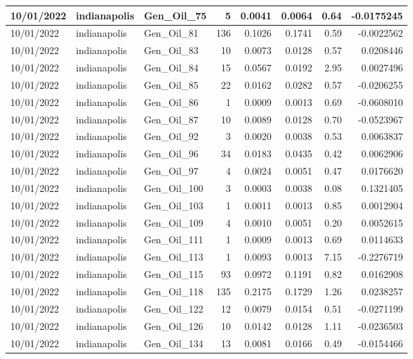 \documentclass[
  letterpaper,
  DIV=11,
  numbers=noendperiod]{scrartcl}
\begin{document}
\begin{tabular}{l|l|l|r|r|r|r|r}
\hline
10/01/2022 & indianapolis & Gen\_Oil\_75 & 5 & 0.0041 & 0.0064 & 0.64 & -0.0175245\\
\hline
10/01/2022 & indianapolis & Gen\_Oil\_81 & 136 & 0.1026 & 0.1741 & 0.59 & -0.0022562\\
\hline
10/01/2022 & indianapolis & Gen\_Oil\_83 & 10 & 0.0073 & 0.0128 & 0.57 & 0.0208446\\
\hline
10/01/2022 & indianapolis & Gen\_Oil\_84 & 15 & 0.0567 & 0.0192 & 2.95 & 0.0027496\\
\hline
10/01/2022 & indianapolis & Gen\_Oil\_85 & 22 & 0.0162 & 0.0282 & 0.57 & -0.0206255\\
\hline
10/01/2022 & indianapolis & Gen\_Oil\_86 & 1 & 0.0009 & 0.0013 & 0.69 & -0.0608010\\
\hline
10/01/2022 & indianapolis & Gen\_Oil\_87 & 10 & 0.0089 & 0.0128 & 0.70 & -0.0523967\\
\hline
10/01/2022 & indianapolis & Gen\_Oil\_92 & 3 & 0.0020 & 0.0038 & 0.53 & 0.0063837\\
\hline
10/01/2022 & indianapolis & Gen\_Oil\_96 & 34 & 0.0183 & 0.0435 & 0.42 & 0.0062906\\
\hline
10/01/2022 & indianapolis & Gen\_Oil\_97 & 4 & 0.0024 & 0.0051 & 0.47 & 0.0176620\\
\hline
10/01/2022 & indianapolis & Gen\_Oil\_100 & 3 & 0.0003 & 0.0038 & 0.08 & 0.1321405\\
\hline
10/01/2022 & indianapolis & Gen\_Oil\_103 & 1 & 0.0011 & 0.0013 & 0.85 & 0.0012904\\
\hline
10/01/2022 & indianapolis & Gen\_Oil\_109 & 4 & 0.0010 & 0.0051 & 0.20 & 0.0052615\\
\hline
10/01/2022 & indianapolis & Gen\_Oil\_111 & 1 & 0.0009 & 0.0013 & 0.69 & 0.0114633\\
\hline
10/01/2022 & indianapolis & Gen\_Oil\_113 & 1 & 0.0093 & 0.0013 & 7.15 & -0.2276719\\
\hline
10/01/2022 & indianapolis & Gen\_Oil\_115 & 93 & 0.0972 & 0.1191 & 0.82 & 0.0162908\\
\hline
10/01/2022 & indianapolis & Gen\_Oil\_118 & 135 & 0.2175 & 0.1729 & 1.26 & 0.0238257\\
\hline
10/01/2022 & indianapolis & Gen\_Oil\_122 & 12 & 0.0079 & 0.0154 & 0.51 & -0.0271199\\
\hline
10/01/2022 & indianapolis & Gen\_Oil\_126 & 10 & 0.0142 & 0.0128 & 1.11 & -0.0236503\\
\hline
10/01/2022 & indianapolis & Gen\_Oil\_134 & 13 & 0.0081 & 0.0166 & 0.49 & -0.0154466\\

\end{tabular}
\end{document}

